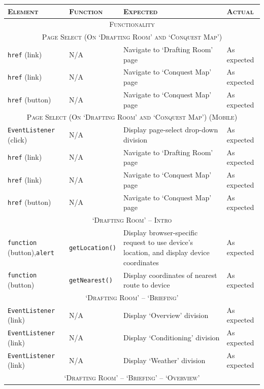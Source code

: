 \documentclass[11pt, english]{article}
\begin{document}
	\begin{center}
		\scriptsize
	\begin{longtable}{p{2.5cm}p{3.5cm}p{5cm}p{1.75cm}}
		\textsc{Element} & \textsc{Function} & \textsc{Expected} & \textsc{Actual}\\
		\hline
		\hline
		\multicolumn{4}{c}{\textsc{Functionality}}\\
		\hline
		\hline
		\multicolumn{4}{c}{\textsc{Page Select (On `Drafting Room' and `Conquest Map')}}\\
		\hline
		\texttt{href} (link) & N/A & Navigate to `Drafting Room' page & As expected\\
		\texttt{href} (link) & N/A & Navigate to `Conquest Map' page & As expected\\
		\texttt{href} (button) & N/A & Navigate to `Conquest Map' page & As expected\\
		\hline
		\multicolumn{4}{c}{\textsc{Page Select (On `Drafting Room' and `Conquest Map') (Mobile)}}\\
		\hline
		\texttt{EventListener} (click) & N/A & Display page-select drop-down division & As expected\\
		\texttt{href} (link) & N/A & Navigate to `Drafting Room' page & As expected\\
		\texttt{href} (link) & N/A & Navigate to `Conquest Map' page & As expected\\
		\texttt{href} (button) & N/A & Navigate to `Conquest Map' page & As expected\\
		\hline
		\multicolumn{4}{c}{\textsc{`Drafting Room' -- Intro}}\\
		\hline
		\texttt{function} (button),\newline \texttt{alert} & \texttt{getLocation()} & Display browser-specific request to use device's location, and display device coordinates & As expected\\
		\texttt{function} (button) & \texttt{getNearest()} & Display coordinates of nearest route to device & As expected\\
		\hline
		\multicolumn{4}{c}{\textsc{`Drafting Room' -- `Briefing'}}\\
		\hline
		\texttt{EventListener} (link) & N/A & Display `Overview' division & As expected\\
		\texttt{EventListener} (link) & N/A & Display `Conditioning' division & As expected\\
		\texttt{EventListener} (link) & N/A & Display `Weather' division & As expected\\
		\hline
		\multicolumn{4}{c}{\textsc{`Drafting Room' -- `Briefing' -- `Overview'}}\\

\end{longtable}
\end{center}
\end{document}
